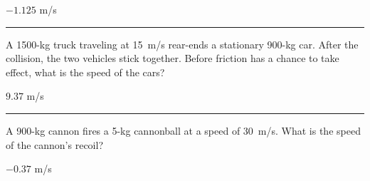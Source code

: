 \documentclass[12pt]{exam}
\begin{document}
\begin{questions}
  \begin{solution}
    $-1.125$ m/s
  \end{solution}

\vs \hrule \vs

\question
  A 1500-kg truck traveling at 15~m/s rear-ends a stationary 900-kg car.  After the collision, the two vehicles stick together.  Before friction has a chance to take effect, what is the speed of the cars?

  \begin{solution}
    $9.37$ m/s
  \end{solution}

\vs \hrule \vs

\question
  A 900-kg cannon fires a 5-kg cannonball at a speed of 30~m/s.  What is the speed of the cannon's recoil?

  \begin{solution}
    $-0.37$ m/s
  \end{solution}

  \vs 




\end{questions}
\end{document}
